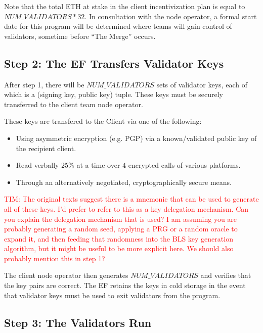 Note that the total ETH at stake in the client incentivization plan is equal to $NUM\_VALIDATORS * 32$. In consultation with the node operator, a formal start date for this program will be determined where teams will gain control of validators, sometime before ``The Merge'' occurs.

\subsection{Step 2:  The EF Transfers Validator Keys}
After step 1, there will be $NUM\_VALIDATORS$ sets of validator keys, each of which is a (signing key, public key) tuple. These keys must be securely transferred to the client team node operator.

These keys are transfered to the Client via one of the following:
\begin{itemize}
\item Using asymmetric encryption (e.g. PGP) via a known/validated public key of the recipient client.
\item Read verbally 25\% at a time over $4$ encrypted calls of various platforms.
\item Through an alternatively negotiated, cryptographically secure means.
\end{itemize}

\textcolor{red}{TIM:  The original texts suggest there is a mnemonic that can be used to generate all of these keys.  I'd prefer to refer to this as a key delegation mechanism.  Can you explain the delegation mechanism that is used?  I am assuming you are probably generating a random seed, applying a PRG or a random oracle to expand it, and then feeding that randomness into the BLS key generation algorithm, but it might be useful to be more explicit here.  We should also probably mention this in step 1?}

The client node operator then generates $NUM\_VALIDATORS$ and verifies that the key pairs are correct. The EF retains the keys in cold storage in the event that validator keys must be used to exit validators from the program.

\subsection{Step 3:  The Validators Run}

